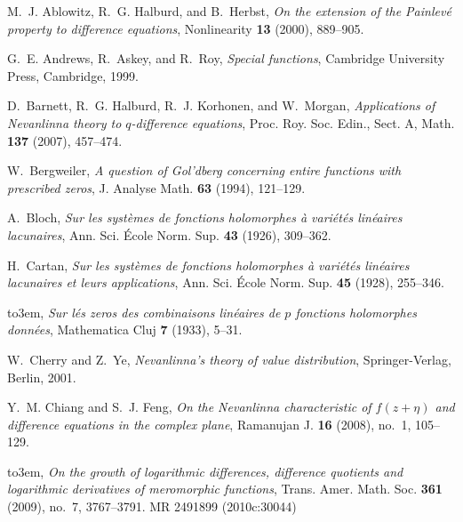\documentclass{amsart}
\theoremstyle{definition}
\numberwithin{equation}{section}
\numberwithin{theorem}{section}
\begin{document}
\def\cprime{$'$}
\providecommand{\bysame}{\leavevmode\hbox to3em{\hrulefill}\thinspace}
\providecommand{\MR}{\relax\ifhmode\unskip\space\fi MR }
\providecommand{\MRhref}[2]{%
  \href{http://www.ams.org/mathscinet-getitem?mr=#1}{#2}
}
\providecommand{\href}[2]{#2}
\begin{thebibliography}{10}

M.~J. Ablowitz, R.~G. Halburd, and B.~Herbst, \emph{On the extension of the
  {P}ainlev{\'e} property to difference equations}, Nonlinearity \textbf{13}
  (2000), 889--905.

G.~E. Andrews, R.~Askey, and R.~Roy, \emph{Special functions}, Cambridge
  University Press, Cambridge, 1999.

D.~Barnett, R.~G. Halburd, R.~J. Korhonen, and W.~Morgan, \emph{Applications of
  {N}evanlinna theory to $q$-difference equations}, Proc. Roy. Soc. Edin.,
  Sect. A, Math. \textbf{137} (2007), 457--474.

W.~Bergweiler, \emph{A question of {G}ol'dberg concerning entire functions with
  prescribed zeros}, J. Analyse Math. \textbf{63} (1994), 121--129.

A.~Bloch, \emph{Sur les syst\`emes de fonctions holomorphes \`a vari\'et\'es
  lin\'eaires lacunaires}, Ann. Sci. \'Ecole Norm. Sup. \textbf{43} (1926),
  309--362.

H.~Cartan, \emph{Sur les syst\`emes de fonctions holomorphes \`a vari\'et\'es
  lin\'eaires lacunaires et leurs applications}, Ann. Sci. \'Ecole Norm. Sup.
  \textbf{45} (1928), 255--346.

\bysame, \emph{Sur l{\'e}s zeros des combinaisons lin{\'e}aires de $p$
  fonctions holomorphes donn{\'e}es}, Mathematica Cluj \textbf{7} (1933),
  5--31.

W.~Cherry and Z.~Ye, \emph{{N}evanlinna's theory of value distribution},
  Springer-Verlag, Berlin, 2001.

Y.~M. Chiang and S.~J. Feng, \emph{On the {N}evanlinna characteristic of
  $f(z+\eta)$ and difference equations in the complex plane}, Ramanujan J.
  \textbf{16} (2008), no.~1, 105--129.

\bysame, \emph{On the growth of logarithmic differences, difference quotients
  and logarithmic derivatives of meromorphic functions}, Trans. Amer. Math.
  Soc. \textbf{361} (2009), no.~7, 3767--3791. \MR{2491899 (2010c:30044)}


\end{thebibliography}
\end{document}
